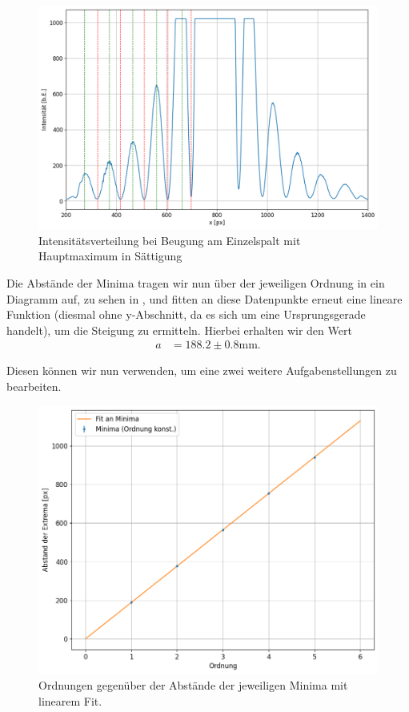 \begin{figure}[H]
  \centering
  \includegraphics[width=.9\textwidth]{files/plots/2/es_saett_extrema.png}
  \caption{Intensitätsverteilung bei Beugung am Einzelspalt mit Hauptmaximum in Sättigung}
  \label{fig:es_saett_extrema}
\end{figure}

Die Abstände der Minima tragen wir nun über der jeweiligen Ordnung in ein Diagramm auf, zu sehen in , und fitten an diese Datenpunkte erneut eine lineare Funktion (diesmal ohne y-Abschnitt, da es sich um eine Ursprungsgerade handelt), um die Steigung zu ermitteln. Hierbei erhalten wir den Wert
\begin{align}
  a &= 188.2 \pm 0.8 \si{\milli\meter}.
\end{align}

Diesen können wir nun verwenden, um eine zwei weitere Aufgabenstellungen zu bearbeiten.

\begin{figure}[H]
  \centering
  \includegraphics[width=.9\textwidth]{files/plots/2/es_fit_ordnung_ohne_maxima.png}
  \caption{Ordnungen gegenüber der Abstände der jeweiligen Minima mit linearem Fit.}
  \label{fig:es_fit_ordnung_ohne_maxima}
\end{figure}

